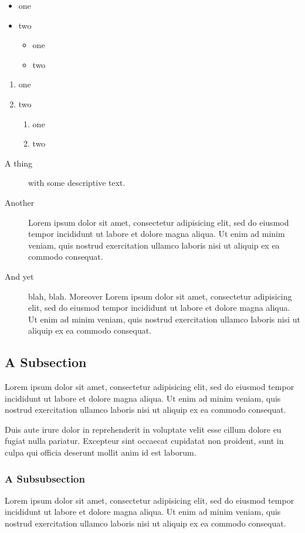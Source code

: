 \documentclass{report}
\begin{document}
\begin{itemize}
 \item one
 \item two
   \begin{itemize}
    \item one
    \item two
   \end{itemize}
\end{itemize}

\begin{enumerate}
 \item one
 \item two
   \begin{enumerate}
    \item one
    \item two
   \end{enumerate}
\end{enumerate}

\begin{description}
\item[A thing] with some descriptive text.
\item[Another] Lorem ipsum dolor sit amet, consectetur adipisicing elit, sed do eiusmod tempor incididunt ut labore et dolore magna aliqua. Ut enim ad minim veniam, quis nostrud exercitation ullamco laboris nisi ut aliquip ex ea commodo consequat. 
\item[And yet] blah, blah. Moreover
Lorem ipsum dolor sit amet, consectetur adipisicing elit, sed do eiusmod tempor incididunt ut labore et dolore magna aliqua. Ut enim ad minim veniam, quis nostrud exercitation ullamco laboris nisi ut aliquip ex ea commodo consequat. 
\end{description}

\subsection{A Subsection}
Lorem ipsum dolor sit amet, consectetur adipisicing elit, sed do eiusmod tempor incididunt ut labore et dolore magna aliqua. Ut enim ad minim veniam, quis nostrud exercitation ullamco laboris nisi ut aliquip ex ea commodo consequat.

Duis aute irure dolor in reprehenderit in voluptate velit esse cillum dolore eu fugiat nulla pariatur. Excepteur sint occaecat cupidatat non proident, sunt in culpa qui officia deserunt mollit anim id est laborum.

\subsubsection{A Subsubsection}
Lorem ipsum dolor sit amet, consectetur adipisicing elit, sed do eiusmod tempor incididunt ut labore et dolore magna aliqua. Ut enim ad minim veniam, quis nostrud exercitation ullamco laboris nisi ut aliquip ex ea commodo consequat.
\end{document}

